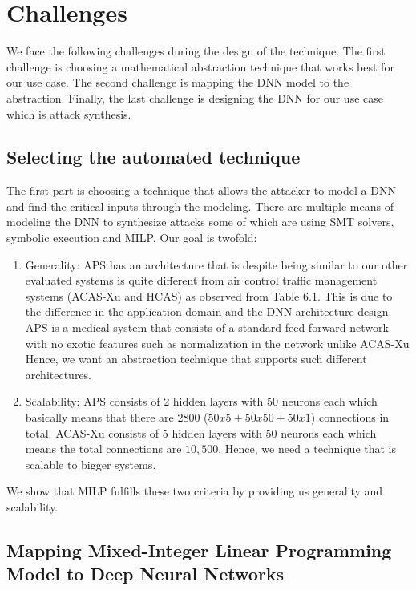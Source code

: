 \chapter{Challenges}
We face  the following challenges during the design of the technique. 
The  first challenge is choosing a mathematical abstraction technique that works best for our use case. 
The second challenge is mapping the \ac{DNN}  model to the abstraction. 
Finally, the last challenge is designing the \ac{DNN}  for our use case which is attack synthesis. 


\section{Selecting  the automated technique}
The first part is choosing a technique that allows the attacker to model a DNN and find the critical inputs through the modeling. 
There are multiple means of modeling the DNN to synthesize attacks some of which are using SMT solvers, symbolic execution and MILP.
Our goal is twofold: 
\begin{enumerate}
	\item Generality: \ac{APS} has an architecture that is despite being similar to our other evaluated systems is quite different from air control traffic management systems (\ac{ACAS-Xu} and \ac{HCAS}) as observed from Table 6.1.
	This is due to the difference in the application domain and the \ac{DNN} architecture design. 
	\ac{APS} is a medical system that consists of a standard feed-forward network with no exotic features such as normalization in the network unlike \ac{ACAS-Xu}
	Hence, we want an abstraction technique that supports such different architectures. 
	\item Scalability: \ac{APS} consists of 2 hidden layers with 50 neurons each which basically means that there are $2800$ ($50x5 + 50x50 + 50x1$) connections in total.
	\ac{ACAS-Xu} consists of 5 hidden layers with 50 neurons each which means the total connections are $10,500$. 
	Hence, we need a technique that is scalable to bigger systems. 
	
\end{enumerate}

 We show that \ac{MILP} fulfills these two criteria by providing us generality and scalability. 


\section{ Mapping  Mixed-Integer Linear Programming Model to Deep Neural Networks}

